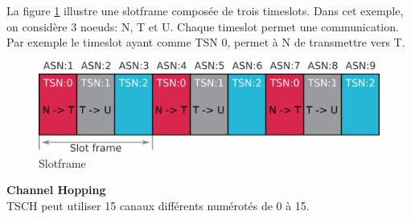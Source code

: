 La figure \ref{todo} illustre une slotframe composée de trois timeslots.
Dans cet exemple, on considère 3 noeuds: N, T et U. Chaque timeslot permet une communication.
Par exemple le timeslot ayant comme TSN 0, permet à N de transmettre vers T.

\begin{figure}[H]
  \centering
  \includegraphics[scale=0.7]{res/pictures/sloframe.png}
  \caption{Slotframe}
  \label{todo}
\end{figure}

\textbf{Channel Hopping}\\

TSCH peut utiliser 15 canaux différents numérotés de 0 à 15.
